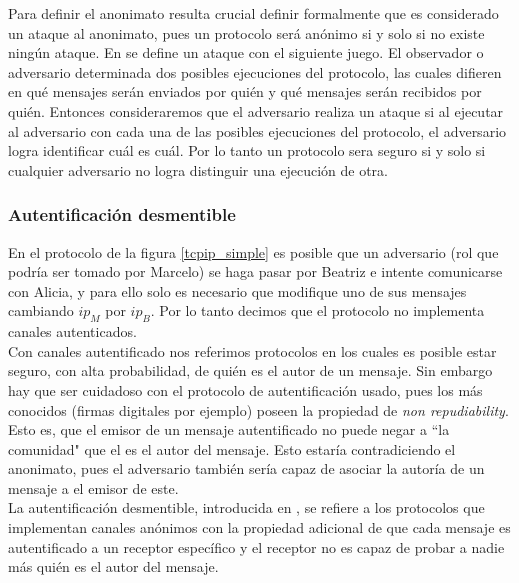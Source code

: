 Para definir el anonimato resulta crucial definir formalmente que es considerado
un ataque al anonimato, pues un protocolo será anónimo si y solo si no existe ningún ataque.
En \cite{conf/pet/HeviaM08} se define un ataque con el siguiente juego.
El observador o adversario determinada dos posibles ejecuciones del protocolo, las cuales difieren en
qué mensajes serán enviados por quién y qué mensajes serán recibidos por quién. Entonces
consideraremos que el adversario realiza un ataque si al ejecutar al adversario con cada una
de las posibles ejecuciones del protocolo, el adversario logra identificar cuál es cuál.
Por lo tanto un protocolo sera seguro si y solo si cualquier adversario no logra distinguir
una ejecución de otra.

\subsubsection{Autentificación desmentible}
En el protocolo de la figura \ref{tcpip_simple} es posible que un adversario (rol que podría ser
tomado por Marcelo) se haga pasar por Beatriz e intente comunicarse con Alicia, y para ello
solo es necesario que modifique uno de sus mensajes cambiando $ip_M$ por $ip_B$.
Por lo tanto decimos que el protocolo no implementa canales autenticados.\\
Con canales autentificado nos referimos protocolos en los cuales es posible estar seguro,
con alta probabilidad, de quién es el autor de un mensaje. Sin embargo hay que ser cuidadoso
con el protocolo de autentificación usado, pues los más conocidos
(firmas digitales por ejemplo) poseen la propiedad de \textit{non repudiability}. Esto es,
que el emisor de un mensaje autentificado no puede negar a ``la comunidad" que el es el autor
del mensaje. Esto estaría contradiciendo el anonimato, pues el adversario también sería capaz
de asociar la autoría de un mensaje a el emisor de este.\\
La autentificación desmentible, introducida en \cite{DwoNaoSah04}, se refiere a los protocolos
que implementan canales anónimos con la propiedad adicional de que cada mensaje es autentificado
a un receptor específico y el receptor no es capaz de probar a nadie más quién es el autor del mensaje.

